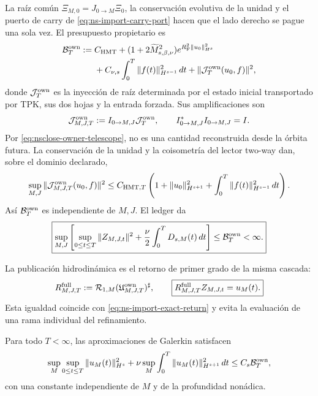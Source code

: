 La raíz común
\(\Xi_{M,0}=J_{0\to M}\Xi_0\), la conservación evolutiva de la unidad y el
puerto de carry de \eqref{eq:ns-import-carry-port} hacen que el lado derecho
se pague una sola vez. El presupuesto propietario es
\begin{equation}
 \begin{aligned}
 \mathcal B_T^{\rm own}:={}&
 C_{\rm HMT}
 +(1+2\widetilde M_{s,\beta,\nu}^2)
  e^{R_{\rm F}^2\|u_0\|_{H^s}^2}\\
 &+C_{\nu,s}\int_0^T\|f(t)\|_{H^{s-1}}^2\,dt
 +\|\mathcal J_T^{\rm own}(u_0,f)\|^2 ,
 \end{aligned}
 \label{eq:nsclose-owner-data-budget}
\end{equation}
donde \(\mathcal J_T^{\rm own}\) es la inyección de raíz determinada por el
estado inicial transportado por TPK, sus dos hojas y la entrada forzada. Sus
amplificaciones son
\[
 \mathcal J_{M,J,T}^{\rm own}
 :=I_{0\to M,J}\mathcal J_T^{\rm own},
 \qquad I_{0\to M,J}^*I_{0\to M,J}=I.
\]
Por \eqref{eq:nsclose-owner-telescope}, no es una cantidad reconstruida desde
la órbita futura. La conservación de la unidad y la coisometría del lector
two-way dan, sobre el dominio declarado,
\begin{equation}
 \sup_{M,J}\|\mathcal J_{M,J,T}^{\rm own}(u_0,f)\|^2
 \le C_{{\rm HMT},T}
 \left(1+\|u_0\|_{H^{s+1}}^2
 +\int_0^T\|f(t)\|_{H^{s-1}}^2\,dt\right).
 \label{eq:nsclose-owner-root-uniformity}
\end{equation}
Así \(\mathcal B_T^{\rm own}\) es independiente de \(M,J\). El ledger da
\begin{equation}
 \boxed{
 \sup_{M,J}\left[
  \sup_{0\le t\le T}\|Z_{M,J,t}\|^2
  +\frac\nu2\int_0^TD_{s,M}(t)\,dt
 \right]\le\mathcal B_T^{\rm own}<\infty.}
 \label{eq:nsclose-proprietary-uniform-budget}
\end{equation}

La publicación hidrodinámica es el retorno de primer grado de la misma
cascada:
\begin{equation}
 R_{M,J,T}^{\rm full}
 :=\mathcal R_{1,M}
   (\mathfrak U_{M,J,T}^{\rm own})^{\sharp},
 \qquad
 \boxed{
 R_{M,J,T}^{\rm full}Z_{M,J,t}=u_M(t).}
 \label{eq:nsclose-proprietary-exact-return}
\end{equation}
\label{eq:nsclose-exact-full-return}
Esta igualdad coincide con \eqref{eq:ns-import-exact-return} y evita la
evaluación de una rama individual del refinamiento.

\begin{theorem}
\label{thm:nsclose-proprietary-full}
Para todo \(T<\infty\), las aproximaciones de Galerkin satisfacen
\begin{equation}
 \sup_M\sup_{0\le t\le T}\|u_M(t)\|_{H^s}^2
 +\nu\sup_M\int_0^T\|u_M(t)\|_{H^{s+1}}^2\,dt
 \le C_s\mathcal B_T^{\rm own},
 \label{eq:nsclose-uniform-sobolev-precompactness}
\end{equation}
\label{eq:nsclose-uniform-sobolev}
con una constante independiente de \(M\) y de la profundidad nonádica.
\end{theorem}

